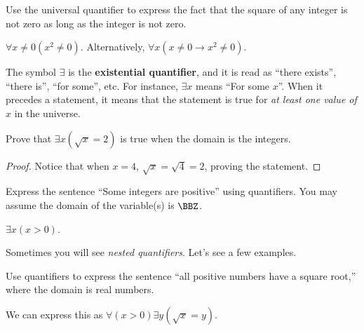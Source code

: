 \begin{exer}
Use the universal quantifier to express the fact that the square of any integer is not zero as long as the
integer is not zero.\\
\answerline
\begin{answer}
$\forall x\neq 0 (x^2\neq 0)$.
Alternatively, $\forall x (x\neq 0 \rightarrow x^2\neq 0)$.
\end{answer}
\end{exer}


\begin{df}
The symbol $\exists$ is the {\bf existential quantifier}, and it is read as ``there exists'',
``there is'', ``for some'', etc.
For instance, $\exists x$ means ``For some $x$''.  When it precedes a statement, 
it means that the statement is true for {\em at least one value of $x$} in the universe.
\end{df}

\vspace*{-.1in}

\begin{exa}
Prove that $\exists x (\sqrt{x}=2)$ is true when the domain is the integers.
\begin{proof}
Notice that when $x=4$, $\sqrt{x}=\sqrt{4}=2$, proving the statement.
\end{proof}
\end{exa}

\vspace*{-.1in}

\begin{exer}
Express the sentence ``Some integers are positive'' using quantifiers.
You may assume the domain of the variable(s) is $\BBZ$.\\
\answerline
\begin{answer}
$\exists x (x>0)$.
\end{answer}
\end{exer}


Sometimes you will see {\em nested quantifiers}.  Let's see a few examples.

\begin{exa}
Use quantifiers to express the sentence ``all positive numbers have a square root,''
where the domain is real numbers.
\begin{sol}We can express this as
$\forall (x > 0) \exists y (\sqrt{x}=y)$.
\end{sol}
\end{exa}

